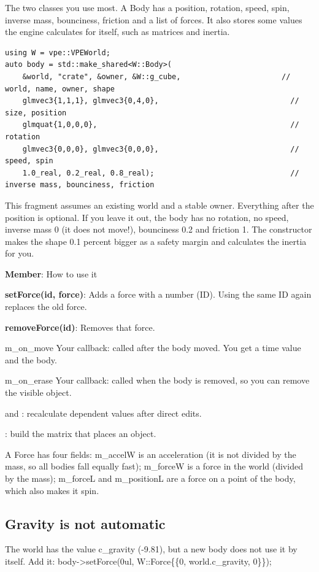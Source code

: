 \documentclass[11pt,a4paper]{article}
\begin{document}
\label{vpe-core-5}
The two classes you use most. A Body has a position, rotation, speed, spin, inverse mass, bounciness, friction and a list of forces. It also stores some values the engine calculates for itself, such as matrices and inertia.

\begin{lstlisting}
using W = vpe::VPEWorld;
auto body = std::make_shared<W::Body>(
    &world, "crate", &owner, &W::g_cube,                       // world, name, owner, shape
    glmvec3{1,1,1}, glmvec3{0,4,0},                              // size, position
    glmquat{1,0,0,0},                                            // rotation
    glmvec3{0,0,0}, glmvec3{0,0,0},                              // speed, spin
    1.0_real, 0.2_real, 0.8_real);                               // inverse mass, bounciness, friction
\end{lstlisting}

This fragment assumes an existing world and a stable owner. Everything after the position is optional. If you leave it out, the body has no rotation, no speed, inverse mass 0 (it does not move!), bounciness 0.2 and friction 1. The constructor makes the shape 0.1 percent bigger as a safety margin and calculates the inertia for you.

\textbf{Member}: How to use it

\textbf{setForce(id, force)}: Adds a force with a number (ID). Using the same ID again replaces the old force.

\textbf{removeForce(id)}: Removes that force.

m\_on\_move                                            Your callback: called after the body moved. You get a time value and the body.

m\_on\_erase                                           Your callback: called when the body is removed, so you can remove the visible object.

 and : recalculate dependent values after direct edits.

: build the matrix that places an object.

A Force has four fields: m\_accelW is an acceleration (it is not divided by the mass, so all bodies fall equally fast); m\_forceW is a force in the world (divided by the mass); m\_forceL and m\_positionL are a force on a point of the body, which also makes it spin.

\subsection*{Gravity is not automatic}
The world has the value c\_gravity (-9.81), but a new body does not use it by itself. Add it: body->setForce(0ul, W::Force\{\{0, world.c\_gravity, 0\}\});
\end{document}
